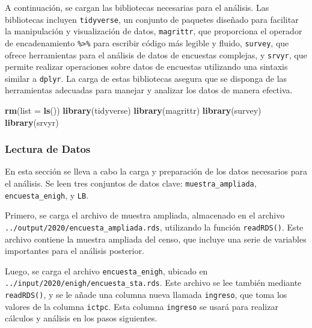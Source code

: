 \documentclass[
  12pt,
]{book}
\newenvironment{Shaded}{\begin{snugshade}}{\end{snugshade}}
\newcommand{\AttributeTok}[1]{\textcolor[rgb]{0.13,0.29,0.53}{#1}}
\newcommand{\FunctionTok}[1]{\textcolor[rgb]{0.13,0.29,0.53}{\textbf{#1}}}
\newcommand{\NormalTok}[1]{#1}
\begin{document}
A continuación, se cargan las bibliotecas necesarias para el análisis. Las bibliotecas incluyen \texttt{tidyverse}, un conjunto de paquetes diseñado para facilitar la manipulación y visualización de datos, \texttt{magrittr}, que proporciona el operador de encadenamiento \texttt{\%\textgreater{}\%} para escribir código más legible y fluido, \texttt{survey}, que ofrece herramientas para el análisis de datos de encuestas complejas, y \texttt{srvyr}, que permite realizar operaciones sobre datos de encuestas utilizando una sintaxis similar a \texttt{dplyr}. La carga de estas bibliotecas asegura que se disponga de las herramientas adecuadas para manejar y analizar los datos de manera efectiva.

\begin{Shaded}
\begin{Highlighting}[]
\FunctionTok{rm}\NormalTok{(}\AttributeTok{list =} \FunctionTok{ls}\NormalTok{())}
\FunctionTok{library}\NormalTok{(tidyverse)}
\FunctionTok{library}\NormalTok{(magrittr)}
\FunctionTok{library}\NormalTok{(survey)}
\FunctionTok{library}\NormalTok{(srvyr)}
\end{Highlighting}
\end{Shaded}

\hypertarget{lectura-de-datos-3}{%
\subsubsection*{Lectura de Datos}\label{lectura-de-datos-3}}

En esta sección se lleva a cabo la carga y preparación de los datos necesarios para el análisis. Se leen tres conjuntos de datos clave: \texttt{muestra\_ampliada}, \texttt{encuesta\_enigh}, y \texttt{LB}.

Primero, se carga el archivo de muestra ampliada, almacenado en el archivo \texttt{../output/2020/encuesta\_ampliada.rds}, utilizando la función \texttt{readRDS()}. Este archivo contiene la muestra ampliada del censo, que incluye una serie de variables importantes para el análisis posterior.

Luego, se carga el archivo \texttt{encuesta\_enigh}, ubicado en \texttt{../input/2020/enigh/encuesta\_sta.rds}. Este archivo se lee también mediante \texttt{readRDS()}, y se le añade una columna nueva llamada \texttt{ingreso}, que toma los valores de la columna \texttt{ictpc}. Esta columna \texttt{ingreso} se usará para realizar cálculos y análisis en los pasos siguientes.
\end{document}
